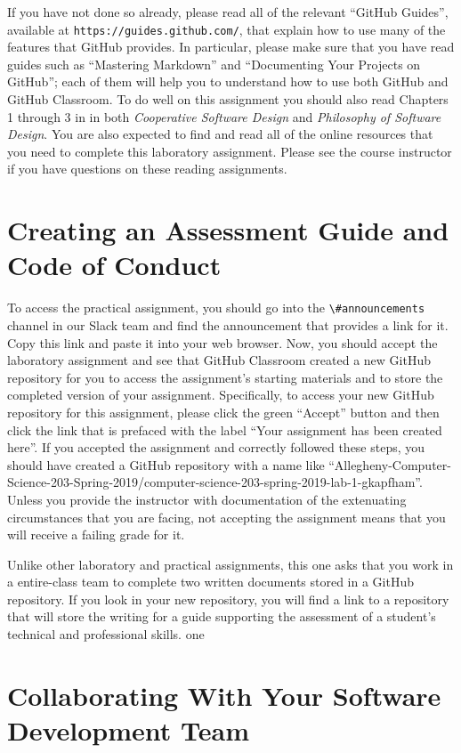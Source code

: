 \documentclass[11pt]{article}
\newcommand{\cooperative}{{\em Cooperative Software Design\/}}
\newcommand{\philosophy}{{\em Philosophy of Software Design\/}}
\newcommand{\url}[1]{\lstinline{#1}}
\newcommand{\channel}[1]{\lstinline{#1}}
\begin{document}
If you have not done so already, please read all of the relevant ``GitHub
Guides'', available at \url{https://guides.github.com/}, that explain how to use
many of the features that GitHub provides. In particular, please make sure that
you have read guides such as ``Mastering Markdown'' and ``Documenting Your
Projects on GitHub''; each of them will help you to understand how to use both
GitHub and GitHub Classroom.
%
To do well on this assignment you should also read Chapters 1 through 3 in in
both \cooperative{} and \philosophy{}.
%
You are also expected to find and read all of the online resources that you need
to complete this laboratory assignment.
%
Please see the course instructor if you have questions on these reading
assignments.

\section*{Creating an Assessment Guide and Code of Conduct}

To access the practical assignment, you should go into the
\channel{\#announcements} channel in our Slack team and find the announcement
that provides a link for it. Copy this link and paste it into your web browser.
Now, you should accept the laboratory assignment and see that GitHub Classroom
created a new GitHub repository for you to access the assignment's starting
materials and to store the completed version of your assignment. Specifically,
to access your new GitHub repository for this assignment, please click the green
``Accept'' button and then click the link that is prefaced with the label ``Your
assignment has been created here''. If you accepted the assignment and correctly
followed these steps, you should have created a GitHub repository with a name
like
``Allegheny-Computer-Science-203-Spring-2019/computer-science-203-spring-2019-lab-1-gkapfham''.
Unless you provide the instructor with documentation of the extenuating
circumstances that you are facing, not accepting the assignment means that you
will receive a failing grade for it.

Unlike other laboratory and practical assignments, this one asks that you work
in a entire-class team to complete two written documents stored in a GitHub
repository. If you look in your new repository, you will find a link to a
repository that will store the writing for a guide supporting the assessment of
a student's technical and professional skills.
one
\section*{Collaborating With Your Software Development Team}
\end{document}
